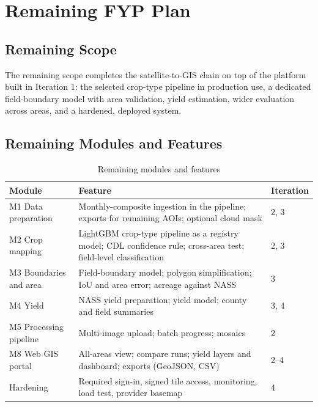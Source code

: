 \chapter{Remaining FYP Plan}\label{ch:remaining}

\section{Remaining Scope}
The remaining scope completes the satellite-to-GIS chain on top of the platform built in Iteration 1:
the selected crop-type pipeline in production use, a dedicated field-boundary model with area
validation, yield estimation, wider evaluation across areas, and a hardened, deployed system.

\section{Remaining Modules and Features}
\begin{table}[htbp]
\centering\small
\caption{Remaining modules and features}
\label{tab:remaining}
\begin{tabularx}{\textwidth}{L{3.6cm} Y L{1.8cm}}
\toprule
\textbf{Module} & \textbf{Feature} & \textbf{Iteration}\\
\midrule
M1 Data preparation & Monthly-composite ingestion in the pipeline; exports for remaining AOIs; optional cloud mask & 2, 3\\
M2 Crop mapping & LightGBM crop-type pipeline as a registry model; CDL confidence rule; cross-area test; field-level classification & 2, 3\\
M3 Boundaries and area & Field-boundary model; polygon simplification; IoU and area error; acreage against NASS & 3\\
M4 Yield & NASS yield preparation; yield model; county and field summaries & 3, 4\\
M5 Processing pipeline & Multi-image upload; batch progress; mosaics & 2\\
M8 Web GIS portal & All-areas view; compare runs; yield layers and dashboard; exports (GeoJSON, CSV) & 2--4\\
Hardening & Required sign-in, signed tile access, monitoring, load test, provider basemap & 4\\
\bottomrule
\end{tabularx}
\end{table}

